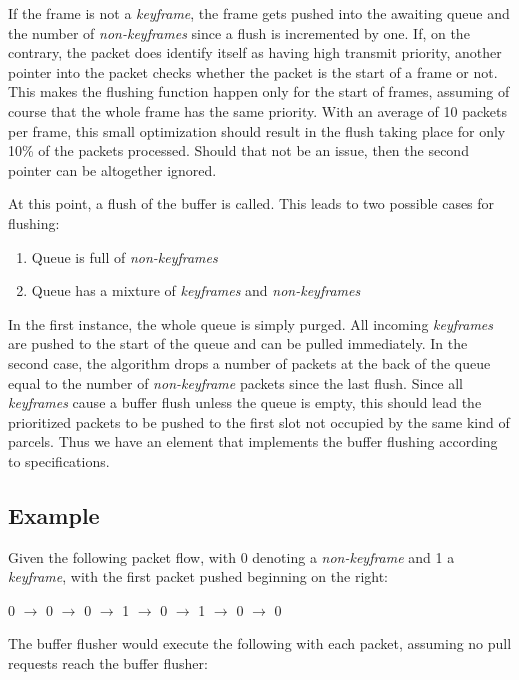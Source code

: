 If the frame is not a \textit{keyframe}, the frame gets pushed into the awaiting queue and the number of \textit{non-keyframes} since a flush is incremented by one. If, on the contrary, the packet does identify itself as having high transmit priority, another pointer into the packet checks whether the packet is the start of a frame or not. This makes the flushing function happen only for the start of frames, assuming of course that the whole frame has the same priority. With an average of 10 packets per frame, this small optimization should result in the flush taking place for only 10\% of the packets processed. Should that not be an issue, then the second pointer can be altogether ignored. 

At this point, a flush of the buffer is called. This leads to two possible cases for flushing:
\begin{enumerate}
\item{Queue is full of \textit{non-keyframes}}
\item{Queue has a mixture of \textit{keyframes} and \textit{non-keyframes}}
\end{enumerate}

In the first instance, the whole queue is simply purged. All incoming \textit{keyframes} are pushed to the start of the queue and can be pulled immediately. In the second case, the algorithm drops a number of packets at the back of the queue equal to the number of \textit{non-keyframe} packets since the last flush. Since all \textit{keyframes} cause a buffer flush unless the queue is empty, this should lead the prioritized packets to be pushed to the first slot not occupied by the same kind of parcels. Thus we have an element that implements the buffer flushing according to specifications.

\subsection{Example}

Given the following packet flow, with 0 denoting a \textit{non-keyframe} and 1 a \textit{keyframe}, with the first packet pushed beginning on the right:


\begin{center}
0 $\rightarrow$ 0 $\rightarrow$ 0 $\rightarrow$ 1 $\rightarrow$ 0 $\rightarrow$ 1 $\rightarrow$ 0 $\rightarrow$ 0
\end{center}

The buffer flusher would execute the following with each packet, assuming no pull requests reach the buffer flusher:

